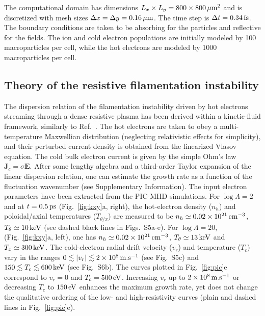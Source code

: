 \documentclass[aps,twocolumn,showpacs,superscriptaddress]{revtex4}
\begin{document}
The computational domain has dimensions
$L_x\times L_y=800 \times 800\,\rm \mu m^2$ and is discretized with mesh sizes $\Delta x=\Delta y =0.16\,\rm \mu m$. The time step is $\Delta t=0.34\,\rm fs$. The boundary conditions are taken to be absorbing for the particles and reflective for the fields. The ion and cold electron populations are initially modeled by 100 macroparticles per cell, while the hot electrons are modeled by 1000 macroparticles per cell.

\subsection*{Theory of the resistive filamentation instability}

The dispersion relation of the filamentation instability driven by hot electrons streaming through a dense resistive plasma has been derived within a kinetic-fluid framework, similarly to Ref.~\cite{POP_Gremillet_2002}. The hot electrons are taken to obey a multi-temperature Maxwellian distribution (neglecting relativistic effects for simplicity), and their perturbed current density is obtained from the linearized Vlasov equation. The cold bulk electron current is given by the simple Ohm's law $\mathbf{J}_c=\sigma \mathbf{E}$.
After some lengthy algebra and a third-order Taylor expansion of the linear dispersion relation, one can estimate the growth rate as a function of the fluctuation wavenumber (see Supplementary Information). The input electron parameters have been extracted from the PIC-MHD simulations. For $\log \Lambda=2$ and at $t=0.5\,\rm ps$ (Fig.~\ref{fig:kxy}a, right), the hot-electron density ($n_h$) and poloidal/axial temperatures ($T_{\theta/x}$) are measured to  be $n_h\simeq 0.02 \times 10^{21}\,\rm cm^{-3}$, $T_\theta \simeq 10\,\rm keV$ (see dashed black lines in Figs.~S5a-e). For $\log \Lambda =20$, (Fig.~\ref{fig:kxy}a, left), one has $n_h \simeq 0.02 \times 10^{21}\,\rm cm^{-3}$,  $T_\theta \simeq 13\,\rm keV$ and $T_x \simeq 300\,\rm keV$. The cold-electron radial drift velocity ($v_r$) and temperature ($T_c$) vary in the ranges $0\lesssim \vert v_r \vert \lesssim 2\times 10^8 \,\rm m.s^{-1}$ (see Fig.~S5c) and $150 \lesssim T_c \lesssim 600\,\rm keV$ (see Fig.~S6b). The curves plotted in Fig.~\ref{fig:pic}e correspond to $v_r = 0$ and $T_c=500\,\rm eV$.
Increasing $v_r$ up to $2\times 10^8 \,\rm m.s^{-1}$ or decreasing $T_c$ to $150\,\rm eV$ enhances the maximum growth rate, yet does not change the qualitative ordering of the low- and high-resistivity curves (plain and dashed lines in Fig.~\ref{fig:pic}e).
\end{document}

